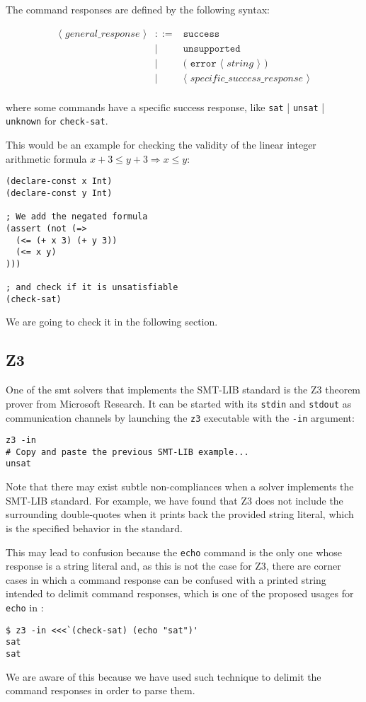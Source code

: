 The command responses are defined by the following syntax:

\[
\begin{array}{rcll}
\langle\textit{ general\_response }\rangle & ::= & \texttt{success}\\
& | & \texttt{unsupported}\\
& | & \texttt{( error } \langle\textit{ string }\rangle \texttt{ ) }\\
& | & \langle\textit{ specific\_success\_response }\rangle\\
\end{array}
\]

where some commands have a specific success response, like \verb|sat| |
\verb|unsat| | \verb|unknown| for \verb|check-sat|.

This would be an example for checking the validity of the linear integer 
arithmetic formula $x + 3 \leq y + 3 \Rightarrow x \leq y$:

\begin{verbatim}
(declare-const x Int)
(declare-const y Int)

; We add the negated formula
(assert (not (=> 
  (<= (+ x 3) (+ y 3)) 
  (<= x y)
)))

; and check if it is unsatisfiable
(check-sat)
\end{verbatim}

We are going to check it in the following section.

\subsection{Z3}

One of the \acrshort{smt} solvers that implements the SMT-LIB standard is the Z3
theorem prover from Microsoft Research. It can be started with its \verb|stdin|
and \verb|stdout| as communication channels by launching the \verb|z3|
executable with the \verb|-in| argument:

\begin{verbatim}
z3 -in 
# Copy and paste the previous SMT-LIB example...
unsat
\end{verbatim}

Note that there may exist subtle non-compliances when a solver implements the
SMT-LIB standard. For example, we have found that Z3 does not include the
surrounding double-quotes when it prints back the provided string literal, which
is the specified behavior in the standard.

This may lead to confusion because the \verb|echo| command is the only one whose
response is a string literal and, as this is not the case for Z3, there are 
corner cases in which a command response can be confused with a printed string
intended to delimit command responses, which is one of the proposed usages for
\verb|echo| in \cite{smtLibStandard}:

\begin{verbatim}
$ z3 -in <<<`(check-sat) (echo "sat")'
sat
sat
\end{verbatim}

We are aware of this because we have used such technique to delimit the command 
responses in order to parse them.
